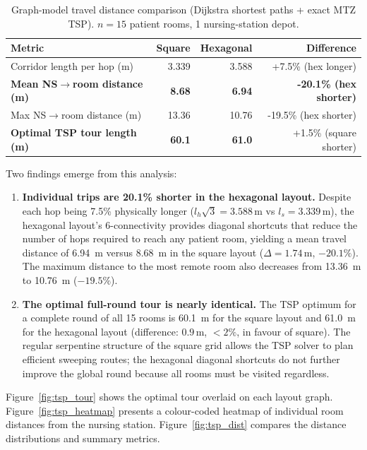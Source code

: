 \documentclass[12pt,a4paper]{article}
\begin{document}
\begin{table}[htbp]
\centering
\caption{Graph-model travel distance comparison (Dijkstra shortest paths + exact MTZ TSP).
$n = 15$ patient rooms, 1 nursing-station depot.}
\label{tab:tsp}
\begin{tabular}{@{}lrrr@{}}
\toprule
Metric & Square & Hexagonal & Difference \\
\midrule
Corridor length per hop (m) & 3.339 & 3.588 & +7.5\% (hex longer) \\
\textbf{Mean NS$\to$room distance (m)} & \textbf{8.68} & \textbf{6.94} & \textbf{-20.1\% (hex shorter)} \\
Max NS$\to$room distance (m) & 13.36 & 10.76 & -19.5\% (hex shorter) \\
\textbf{Optimal TSP tour length (m)} & \textbf{60.1} & \textbf{61.0} & +1.5\% (square shorter) \\
\bottomrule
\end{tabular}
\end{table}

Two findings emerge from this analysis:

\begin{enumerate}[noitemsep]
  \item \textbf{Individual trips are 20.1\% shorter in the hexagonal layout.}
    Despite each hop being 7.5\% physically longer ($l_h\sqrt{3} = 3.588\,\text{m}$
    vs $l_s = 3.339\,\text{m}$), the hexagonal layout's 6-connectivity provides
    diagonal shortcuts that reduce the number of hops required to reach any patient
    room, yielding a mean travel distance of \SI{6.94}{\metre} versus \SI{8.68}{\metre}
    in the square layout ($\Delta = 1.74\,\text{m}$, $-20.1\%$).
    The maximum distance to the most remote room also decreases from
    \SI{13.36}{\metre} to \SI{10.76}{\metre} ($-19.5\%$).

  \item \textbf{The optimal full-round tour is nearly identical.}
    The TSP optimum for a complete round of all 15 rooms is \SI{60.1}{\metre} for
    the square layout and \SI{61.0}{\metre} for the hexagonal layout
    (difference: $0.9\,\text{m}$, $<2\%$, in favour of square).
    The regular serpentine structure of the square grid allows the TSP solver to plan
    efficient sweeping routes; the hexagonal diagonal shortcuts do not further improve
    the global round because all rooms must be visited regardless.
\end{enumerate}

Figure~\ref{fig:tsp_tour} shows the optimal tour overlaid on each layout graph.
Figure~\ref{fig:tsp_heatmap} presents a colour-coded heatmap of individual room
distances from the nursing station.
Figure~\ref{fig:tsp_dist} compares the distance distributions and summary metrics.
\end{document}
